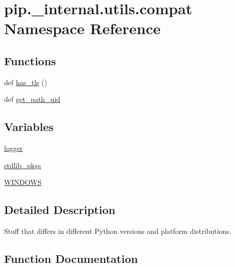 \hypertarget{namespacepip_1_1__internal_1_1utils_1_1compat}{}\section{pip.\+\_\+internal.\+utils.\+compat Namespace Reference}
\label{namespacepip_1_1__internal_1_1utils_1_1compat}
\subsection*{Functions}
\begin{DoxyCompactItemize}
\item 
def \hyperlink{namespacepip_1_1__internal_1_1utils_1_1compat_a99480fdd51d84c986b0e45b301aa51f9}{has\+\_\+tls} ()
\item 
def \hyperlink{namespacepip_1_1__internal_1_1utils_1_1compat_a31dba926bcd06e858d55b2d74c268ea1}{get\+\_\+path\+\_\+uid}
\end{DoxyCompactItemize}
\subsection*{Variables}
\begin{DoxyCompactItemize}
\item 
\hyperlink{namespacepip_1_1__internal_1_1utils_1_1compat_a65e053f583b83de19eee10b715b84aab}{logger}
\item 
\hyperlink{namespacepip_1_1__internal_1_1utils_1_1compat_a837324c3f0e422a7bbc98e84853d3dbe}{stdlib\+\_\+pkgs}
\item 
\hyperlink{namespacepip_1_1__internal_1_1utils_1_1compat_a9e3348f56c06506309c9a4013e5ae394}{W\+I\+N\+D\+O\+WS}
\end{DoxyCompactItemize}


\subsection{Detailed Description}
\begin{DoxyVerb}Stuff that differs in different Python versions and platform
distributions.\end{DoxyVerb}
 

\subsection{Function Documentation}
\mbox{\label{namespacepip_1_1__internal_1_1utils_1_1compat_a31dba926bcd06e858d55b2d74c268ea1}} 
